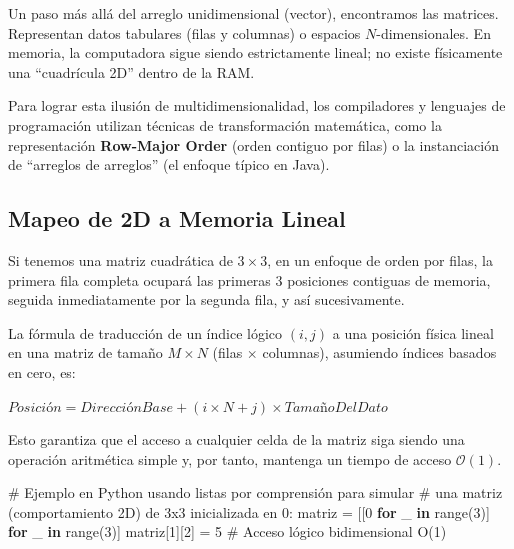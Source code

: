 \documentclass[
  spanish,
  letterpaper,
  DIV=11,
  numbers=noendperiod]{scrreprt}
\newenvironment{Shaded}{\begin{snugshade}}{\end{snugshade}}
\newcommand{\BuiltInTok}[1]{\textcolor[rgb]{0.00,0.23,0.31}{#1}}
\newcommand{\CommentTok}[1]{\textcolor[rgb]{0.37,0.37,0.37}{#1}}
\newcommand{\ControlFlowTok}[1]{\textcolor[rgb]{0.00,0.23,0.31}{\textbf{#1}}}
\newcommand{\DecValTok}[1]{\textcolor[rgb]{0.68,0.00,0.00}{#1}}
\newcommand{\KeywordTok}[1]{\textcolor[rgb]{0.00,0.23,0.31}{\textbf{#1}}}
\newcommand{\NormalTok}[1]{\textcolor[rgb]{0.00,0.23,0.31}{#1}}
\newcommand{\OperatorTok}[1]{\textcolor[rgb]{0.37,0.37,0.37}{#1}}
\begin{document}
Un paso más allá del arreglo unidimensional (vector), encontramos las
matrices. Representan datos tabulares (filas y columnas) o espacios
\(N\)-dimensionales. En memoria, la computadora sigue siendo
estrictamente lineal; no existe físicamente una ``cuadrícula 2D'' dentro
de la RAM.

Para lograr esta ilusión de multidimensionalidad, los compiladores y
lenguajes de programación utilizan técnicas de transformación
matemática, como la representación \textbf{Row-Major Order} (orden
contiguo por filas) o la instanciación de ``arreglos de arreglos'' (el
enfoque típico en Java).

\subsection{Mapeo de 2D a Memoria
Lineal}\label{mapeo-de-2d-a-memoria-lineal}

Si tenemos una matriz cuadrática de \(3 \times 3\), en un enfoque de
orden por filas, la primera fila completa ocupará las primeras 3
posiciones contiguas de memoria, seguida inmediatamente por la segunda
fila, y así sucesivamente.

La fórmula de traducción de un índice lógico \((i, j)\) a una posición
física lineal en una matriz de tamaño \(M \times N\) (filas \(\times\)
columnas), asumiendo índices basados en cero, es:

\(Posición = DirecciónBase + (i \times N + j) \times TamañoDelDato\)

Esto garantiza que el acceso a cualquier celda de la matriz siga siendo
una operación aritmética simple y, por tanto, mantenga un tiempo de
acceso \(\mathcal{O}(1)\).

\begin{Shaded}
\begin{Highlighting}[]
\CommentTok{\# Ejemplo en Python usando listas por comprensión para simular}
\CommentTok{\# una matriz (comportamiento 2D) de 3x3 inicializada en 0:}
\NormalTok{matriz }\OperatorTok{=}\NormalTok{ [[}\DecValTok{0} \ControlFlowTok{for}\NormalTok{ \_ }\KeywordTok{in} \BuiltInTok{range}\NormalTok{(}\DecValTok{3}\NormalTok{)] }\ControlFlowTok{for}\NormalTok{ \_ }\KeywordTok{in} \BuiltInTok{range}\NormalTok{(}\DecValTok{3}\NormalTok{)]}
\NormalTok{matriz[}\DecValTok{1}\NormalTok{][}\DecValTok{2}\NormalTok{] }\OperatorTok{=} \DecValTok{5} \CommentTok{\# Acceso lógico bidimensional O(1)}
\end{Highlighting}
\end{Shaded}
\end{document}
